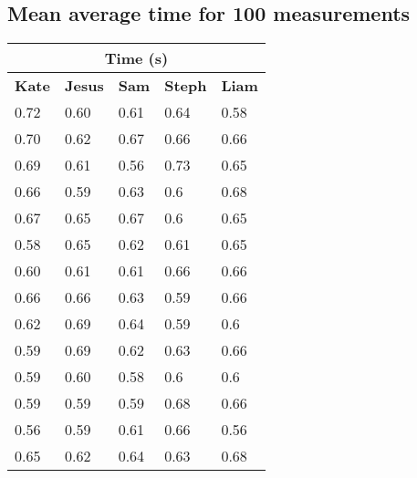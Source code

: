 \documentclass[11pt, letterpaper, includehead]{article}
\begin{document}
\setcounter{subsection}{3} %
\subsection{Mean average time for 100 measurements} %
\begin{center}
  \begin{tabular}{|  m{2cm} | m{2cm} | m{2cm} | m{2cm} | m{2cm} | }
    \hline
    \multicolumn{5}{|c|}{\textbf{Time (s)}}\\
    \hline
    \textbf{Kate} & \textbf{Jesus} & \textbf{Sam} & \textbf{Steph} & \textbf{Liam} \\
    \hline
    0.72          & 0.60           & 0.61         & 0.64           & 0.58          \\
    \hline
    0.70          & 0.62           & 0.67         & 0.66           & 0.66          \\
    \hline
    0.69          & 0.61           & 0.56         & 0.73           & 0.65          \\
    \hline
    0.66          & 0.59           & 0.63         & 0.6            & 0.68          \\
    \hline
    0.67          & 0.65           & 0.67         & 0.6            & 0.65          \\
    \hline
    0.58          & 0.65           & 0.62         & 0.61           & 0.65          \\
    \hline
    0.60          & 0.61           & 0.61         & 0.66           & 0.66          \\
    \hline
    0.66          & 0.66           & 0.63         & 0.59           & 0.66          \\
    \hline
    0.62          & 0.69           & 0.64         & 0.59           & 0.6           \\
    \hline
    0.59          & 0.69           & 0.62         & 0.63           & 0.66          \\
    \hline
    0.59          & 0.60           & 0.58         & 0.6            & 0.6           \\
    \hline
    0.59          & 0.59           & 0.59         & 0.68           & 0.66          \\
    \hline
    0.56          & 0.59           & 0.61         & 0.66           & 0.56          \\
    \hline
    0.65          & 0.62           & 0.64         & 0.63           & 0.68          \\
    \hline

\end{tabular}
\end{center}
\end{document}
